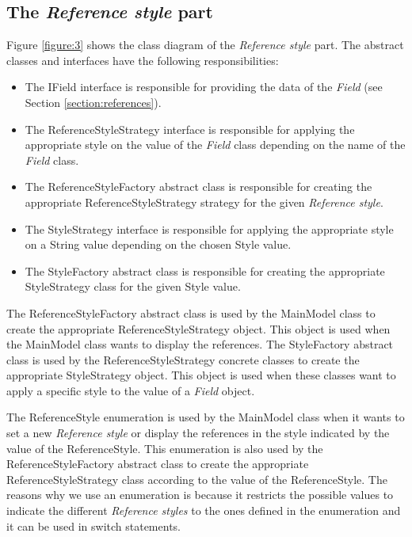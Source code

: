 \documentclass[a4paper]{article}
\begin{document}

\subsection{The \textit{Reference style} part}
Figure \ref{figure:3} shows the class diagram of the \textit{Reference style} part. The abstract classes and interfaces have the following responsibilities:

\begin{itemize}
	\item The IField interface is responsible for providing the data of the \textit{Field} (see Section \ref{section:references}).
	\item The ReferenceStyleStrategy interface is responsible for applying the appropriate style on the value of the \textit{Field} class depending on the name of the \textit{Field} class.
	\item The ReferenceStyleFactory abstract class is responsible for creating the appropriate ReferenceStyleStrategy strategy for the given \textit{Reference style}.
	\item The StyleStrategy interface is responsible for applying the appropriate style on a String value depending on the chosen Style value.
	\item The StyleFactory abstract class is responsible for creating the appropriate StyleStrategy class for the given Style value.
\end{itemize}

The ReferenceStyleFactory abstract class is used by the MainModel class to create the appropriate ReferenceStyleStrategy object. This object is used when the MainModel class wants to display the references. The StyleFactory abstract class is used by the ReferenceStyleStrategy concrete classes to create the appropriate StyleStrategy object. This object is used when these classes want to apply a specific style to the value of a \textit{Field} object.

The ReferenceStyle enumeration is used by the MainModel class when it wants to set a new \textit{Reference style} or display the references in the style indicated by the value of the ReferenceStyle. This enumeration is also used by the ReferenceStyleFactory abstract class to create the appropriate ReferenceStyleStrategy class according to the value of the ReferenceStyle. The reasons why we use an enumeration is because it restricts the possible values to indicate the different \textit{Reference styles} to the ones defined in the enumeration and it can be used in switch statements.
\end{document}
